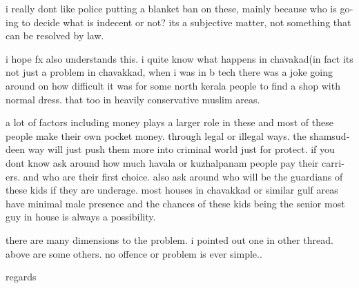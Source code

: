 \begin{english}
i really dont like police putting a blanket ban on these, mainly
because who is going to decide what is indecent or not? its a
subjective matter, not something that can be resolved by law.

i hope fx also understands this. i quite know what happens in
chavakad(in fact its not just a problem in chavakkad, when i was in b
tech there was a joke going around on how difficult it was for some
north kerala people to find a shop with normal dress. that too in
heavily conservative muslim areas.

a lot of factors including money plays a larger role in these and most
of these people make their own pocket money. through legal or illegal
ways. the shamsuddeen way will just push them more into criminal world
just for protect. if you dont know ask around how much havala or
kuzhalpanam people pay their carriers. and who are their first choice.
also ask around who will be the guardians of these kids if they are
underage. most houses in chavakkad or similar gulf areas have minimal
male presence and the chances of these kids being the senior most guy
in house is always a possibility.

there are many dimensions to the problem. i pointed out one in other
thread. above are some others. no offence or problem is ever simple..

regards
\end{english}

